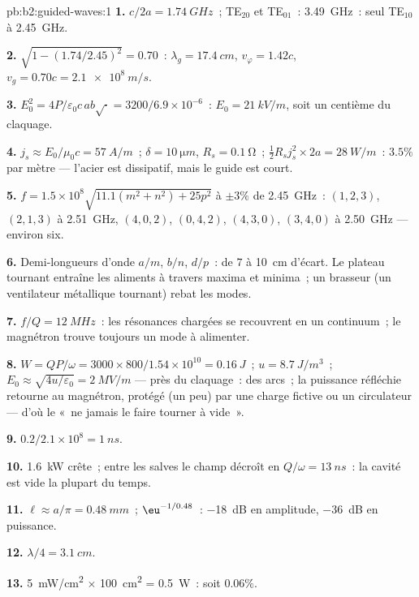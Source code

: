 \begin{solution}{pb:b2:guided-waves:1}
\textbf{1.} $c/2a = \qty{1.74}{GHz}$~; TE$_{20}$ et TE$_{01}$~: \qty{3.49}{GHz}~: seul
TE$_{10}$ à \qty{2.45}{GHz}.

\textbf{2.} $\sqrt{1 - (1.74/2.45)^2} = 0.70$~: $\lambda_g = \qty{17.4}{cm}$, $v_\varphi = 1.42c$,
$v_g = 0.70c = \qty{2.1e8}{m/s}$.

\textbf{3.} $E_0^2 = 4P/\varepsilon_0c\,ab\sqrt{\cdot} = 3200/6.9 \times 10^{-6}$~: $E_0 = \qty{21}{kV/m}$,
soit un centième du claquage.

\textbf{4.} $j_s \approx E_0/\mu_0c = \qty{57}{A/m}$~; $\delta = \qty{10}{\micro m}$, $R_s = \qty{0.1}{\ohm}$~;
$\tfrac12R_sj_s^2 \times 2a = \qty{28}{W/m}$~: $3.5\%$ par mètre --- l'acier est dissipatif,
mais le guide est court.

\textbf{5.} $f = 1.5 \times 10^8\sqrt{11.1(m^2 + n^2) + 25p^2}$ à $\pm3\%$ de
\qty{2.45}{GHz}~: $(1, 2, 3)$, $(2, 1, 3)$ à \qty{2.51}{GHz}, $(4, 0, 2)$, $(0, 4, 2)$,
$(4, 3, 0)$, $(3, 4, 0)$ à \qty{2.50}{GHz} --- environ six.

\textbf{6.} Demi-longueurs d'onde $a/m$, $b/n$, $d/p$~: de $7$ à \qty{10}{cm} d'écart. Le
plateau tournant entraîne les aliments à travers maxima et minima~; un brasseur (un
ventilateur métallique tournant) rebat les modes.

\textbf{7.} $f/Q = \qty{12}{MHz}$~: les résonances chargées se recouvrent en un
continuum~; le magnétron trouve toujours un mode à alimenter.

\textbf{8.} $W = QP/\omega = 3000 \times 800/1.54 \times 10^{10} = \qty{0.16}{J}$~; $u = \qty{8.7}{J/m^3}$~;
$E_0 \approx \sqrt{4u/\varepsilon_0} = \qty{2}{MV/m}$ --- près du claquage~: des arcs~; la puissance
réfléchie retourne au magnétron, protégé (un peu) par une charge
fictive ou un circulateur --- d'où le «~ne jamais le faire tourner à vide~».

\textbf{9.} $0.2/2.1 \times 10^8 = \qty{1}{ns}$.

\textbf{10.} \qty{1.6}{kW} crête~; entre les salves le champ décroît en
$Q/\omega = \qty{13}{ns}$~: la cavité est vide la plupart du temps.

\textbf{11.} $\ell \approx a/\pi = \qty{0.48}{mm}$~; $\eu^{-1/0.48}$~: \qty{-18}{dB} en amplitude,
\qty{-36}{dB} en puissance.

\textbf{12.} $\lambda/4 = \qty{3.1}{cm}$.

\textbf{13.} \qty{5}{mW/cm^2} $\times$ \qty{100}{cm^2} = \qty{0.5}{W}~: soit $0.06\%$.


\end{solution}
